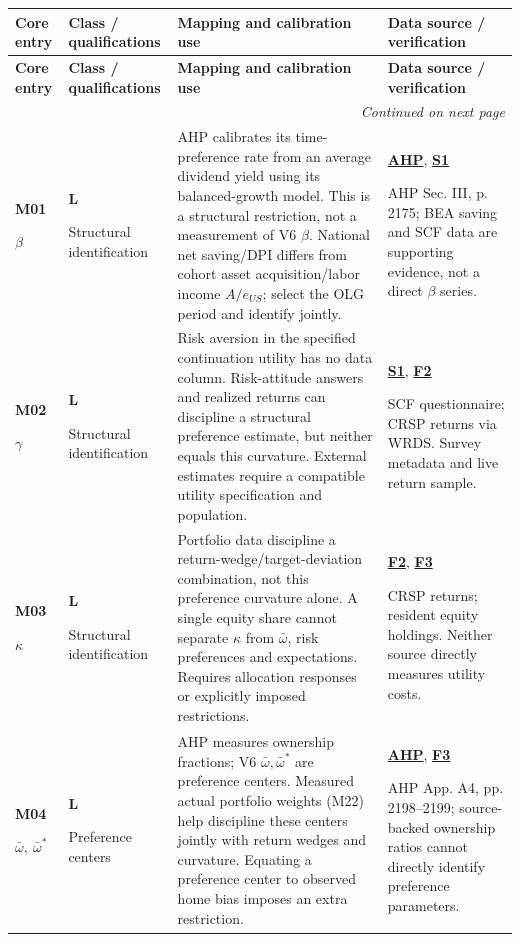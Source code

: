 \documentclass[10pt,a4paper,landscape]{article}
\makeatletter
\newenvironment{measuretable}{%
\fontsize{9.4}{10.8}\selectfont\setlength{\parskip}{1pt}
\begin{longtable}{@{}P{\dimexpr .14\textwidth-4.2pt\relax}P{\dimexpr .135\textwidth-4.05pt\relax}P{\dimexpr .455\textwidth-13.65pt\relax}P{\dimexpr .27\textwidth-8.1pt\relax}@{}}
\toprule\rowcolor{tablehead}\textbf{Core entry} & \textbf{Class / qualifications} & \textbf{Mapping and calibration use} & \textbf{Data source / verification}\\\midrule
\endfirsthead
\toprule\rowcolor{tablehead}\textbf{Core entry} & \textbf{Class / qualifications} & \textbf{Mapping and calibration use} & \textbf{Data source / verification}\\\midrule
\endhead\midrule\multicolumn{4}{r}{\footnotesize\itshape Continued on next page}\\\endfoot
\bottomrule\endlastfoot
}{\end{longtable}}
\makeatother
\begin{document}
\begin{measuretable}
\textbf{M01}\par $\beta$ & \textbf{L}\par Structural identification & AHP calibrates its time-preference rate from an average dividend yield using its balanced-growth model. This is a structural restriction, not a measurement of V6 $\beta$. National net saving/DPI differs from cohort asset acquisition/labor income $A/e_{US}$; select the OLG period and identify jointly. & \hyperlink{src-AHP}{\textbf{AHP}}, \hyperlink{src-S1}{\textbf{S1}}\par AHP Sec. III, p. 2175; BEA saving and SCF data are supporting evidence, not a direct $\beta$ series.\\[4pt]
\textbf{M02}\par $\gamma$ & \textbf{L}\par Structural identification & Risk aversion in the specified continuation utility has no data column. Risk-attitude answers and realized returns can discipline a structural preference estimate, but neither equals this curvature. External estimates require a compatible utility specification and population. & \hyperlink{src-S1}{\textbf{S1}}, \hyperlink{src-F2}{\textbf{F2}}\par SCF questionnaire; CRSP returns via WRDS. Survey metadata and live return sample.\\[4pt]
\textbf{M03}\par $\kappa$ & \textbf{L}\par Structural identification & Portfolio data discipline a return-wedge/target-deviation combination, not this preference curvature alone. A single equity share cannot separate $\kappa$ from $\bar\omega$, risk preferences and expectations. Requires allocation responses or explicitly imposed restrictions. & \hyperlink{src-F2}{\textbf{F2}}, \hyperlink{src-F3}{\textbf{F3}}\par CRSP returns; resident equity holdings. Neither source directly measures utility costs.\\[4pt]
\textbf{M04}\par $\bar\omega,\ \bar\omega^*$ & \textbf{L}\par Preference centers & AHP measures ownership fractions; V6 $\bar\omega,\bar\omega^*$ are preference centers. Measured actual portfolio weights (M22) help discipline these centers jointly with return wedges and curvature. Equating a preference center to observed home bias imposes an extra restriction. & \hyperlink{src-AHP}{\textbf{AHP}}, \hyperlink{src-F3}{\textbf{F3}}\par AHP App. A4, pp. 2198--2199; source-backed ownership ratios cannot directly identify preference parameters.\\[4pt]

\end{measuretable}
\end{document}
